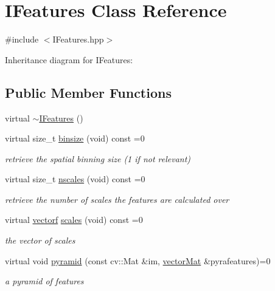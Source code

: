 \hypertarget{classIFeatures}{}\section{I\+Features Class Reference}
\label{classIFeatures}


{\ttfamily \#include $<$I\+Features.\+hpp$>$}



Inheritance diagram for I\+Features\+:
\subsection*{Public Member Functions}
\begin{DoxyCompactItemize}
\item 
virtual \hyperlink{classIFeatures_a7de8c9d6739ebd4504f9d033d71c2f42}{$\sim$\+I\+Features} ()
\item 
virtual size\+\_\+t \hyperlink{classIFeatures_a79f6861190d7c2754d560c6c10baa787}{binsize} (void) const =0
\begin{DoxyCompactList}\small\item\em retrieve the spatial binning size (1 if not relevant) \end{DoxyCompactList}\item 
virtual size\+\_\+t \hyperlink{classIFeatures_abf8d0bf5f66e7b3188ca73b5c9e48a1f}{nscales} (void) const =0
\begin{DoxyCompactList}\small\item\em retrieve the number of scales the features are calculated over \end{DoxyCompactList}\item 
virtual \hyperlink{types_8hpp_a4da5db3ee9e284f719ef5764dbadffc8}{vectorf} \hyperlink{classIFeatures_ad02aea9fd29e438d25e1c7d68c508b9e}{scales} (void) const =0
\begin{DoxyCompactList}\small\item\em the vector of scales \end{DoxyCompactList}\item 
virtual void \hyperlink{classIFeatures_a0cd270503671145fae965c8d9fedc91a}{pyramid} (const cv\+::\+Mat \&im, \hyperlink{types_8hpp_a3207a7addcfa415d1c83622febcb1e9b}{vector\+Mat} \&pyrafeatures)=0
\begin{DoxyCompactList}\small\item\em a pyramid of features \end{DoxyCompactList}\end{DoxyCompactItemize}


